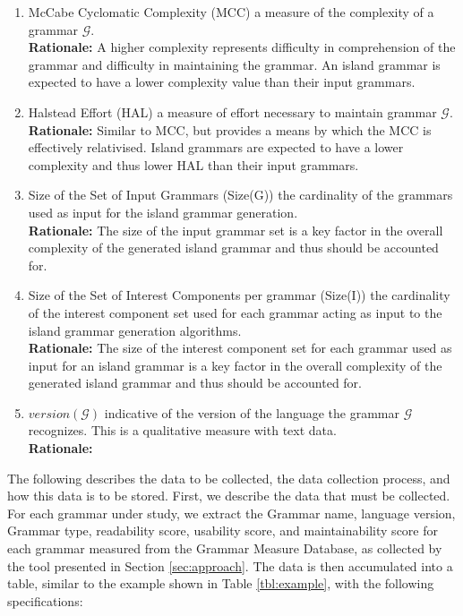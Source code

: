 \documentclass[10pt,nocc]{xrese_report}
\begin{document}
\begin{enumerate}[left=1em,label=\bfseries M\arabic*:]
  \item McCabe Cyclomatic Complexity (MCC) a measure of the complexity of a grammar $\mathcal{G}$. \\
  \textbf{Rationale:} A higher complexity represents difficulty in comprehension of the grammar and difficulty in maintaining the grammar. An island grammar is expected to have a lower complexity value than their input grammars.
  \item Halstead Effort (HAL) a measure of effort necessary to maintain grammar $\mathcal{G}$. \\
  \textbf{Rationale:} Similar to MCC, but provides a means by which the MCC is effectively relativised. Island grammars are expected to have a lower complexity and thus lower HAL than their input grammars.
  \item Size of the Set of Input Grammars (Size(G)) the cardinality of the grammars used as input for the island grammar generation. \\
  \textbf{Rationale:} The size of the input grammar set is a key factor in the overall complexity of the generated island grammar and thus should be accounted for.
  \item Size of the Set of Interest Components per grammar (Size(I)) the cardinality of the interest component set used for each grammar acting as input to the island grammar generation algorithms. \\
  \textbf{Rationale:} The size of the interest component set for each grammar used as input for an island grammar is a key factor in the overall complexity of the generated island grammar and thus should be accounted for.
  \item $version(\mathcal{G})$ indicative of the version of the language the grammar $\mathcal{G}$ recognizes. This is a qualitative measure with text data.\\
  \textbf{Rationale:}
\end{enumerate}

The following describes the data to be collected, the data collection process, and how this data is to be stored.
First, we describe the data that must be collected. For each grammar under study, we extract the Grammar name, language version,
Grammar type, readability score, usability score, and maintainability score for each grammar measured from the Grammar Measure Database, as collected by the tool presented in Section \ref{sec:approach}. The data is then accumulated into a table, similar to the example shown in Table \ref{tbl:example}, with the following specifications:
\end{document}
